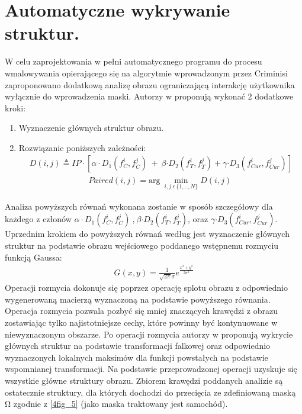 \documentclass[12pt, twoside, openany]{report}
\theoremstyle{definition}
\begin{document}
\section{Automatyczne wykrywanie struktur.}
W celu zaprojektowania w pełni automatycznego programu do procesu wmalowywania opierającego się na algorytmie wprowadzonym przez Criminisi zaproponowano dodatkową analizę obrazu ograniczającą interakcję użytkownika wyłącznie do wprowadzenia maski. Autorzy w \cite{SalientStrucTexProp} proponują wykonać 2 dodatkowe kroki:
\begin{enumerate}
\item
Wyznaczenie głównych struktur obrazu.
\item
Rozwiązanie poniższych zależności:
\begin{align}
D(i,j)\triangleq IP\cdot \left[\alpha \cdot D_1\left(f^i_C,f^j_C\right)\ +\ \beta {\cdot D}_2\left(f^i_T,f^j_T\right)+\gamma {\cdot D}_3\left(f^i_{Cur},f^j_{Cur}\right)\right]
\label{SalientDistance}
\end{align}
\begin{align}
Paired\left(i,j\right)={\mathrm{arg}\ \mathop{\mathrm{min}}_{i,j\ \epsilon \mathrm{\ }\{1,..,N\}} D(i,j)\ }
\label{SalientPair}
\end{align}
\end{enumerate}
Analiza powyższych równań wykonana zostanie w sposób szczegółowy dla każdego z członów $\alpha \cdot D_1\left(f^i_C,f^j_C\right)\ $,$\ \beta {\cdot D}_2\left(f^i_T,f^j_T\right)$, oraz $\gamma {\cdot D}_3\left(f^i_{Cur},f^j_{Cur}\right)$. Uprzednim krokiem do powyższych równań według \cite{SalientStrucTexProp} jest wyznaczenie głównych struktur na podstawie obrazu wejściowego poddanego wstępnemu rozmyciu funkcją Gaussa:
\begin{align}
G\left(x,y\right)=\frac{1}{\sqrt{2\pi }\sigma }e^{\frac{x^2+y^2}{2{\sigma }^2}}
\label{rozmycieGaussa}
\end{align}
Operacji rozmycia dokonuje się poprzez operację splotu obrazu z odpowiednio wygenerowaną macierzą wyznaczoną na podstawie powyższego równania. Operacja rozmycia pozwala pozbyć się mniej znaczących krawędzi z obrazu zostawiając tylko najistotniejsze cechy, które powinny być kontynuowane w niewyznaczonym obszarze. Po operacji rozmycia autorzy w \cite{SalientStrucTexProp} proponują wykrycie głównych struktur na podstawie transformacji falkowej oraz odpowiednio wyznaczonych lokalnych maksimów dla funkcji powstałych na podstawie wspomnianej transformacji. Na podstawie przeprowadzonej operacji uzyskuje się wszystkie główne struktury obrazu. Zbiorem krawędzi poddanych analizie są ostatecznie struktury, dla których dochodzi do przecięcia ze zdefiniowaną maską $\mathrm{\Omega }$ zgodnie z \autoref{4fig_5} (jako maska traktowany jest samochód).
\end{document}
